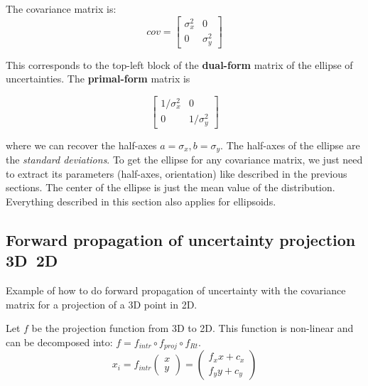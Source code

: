 The covariance matrix is:
\begin{equation}
    cov = \left[\begin{array}{cc}
        \sigma_x^2 & 0 \\
        0 & \sigma_y^2
    \end{array}\right]
\end{equation}

This corresponds to the top-left block of the \textbf{dual-form} matrix of the ellipse of uncertainties. The \textbf{primal-form} matrix is

\begin{equation}
    \left[\begin{array}{cc}
        1/\sigma_x^2 & 0 \\
        0 & 1/\sigma_y^2
    \end{array}\right]
\end{equation}

where we can recover the half-axes $a = \sigma_x, b = \sigma_y$.
The half-axes of the ellipse are the \textit{standard deviations}. To get the ellipse for any covariance matrix, we just need to extract its parameters (half-axes, orientation) like described in the previous sections. The center of the ellipse is just the mean value of the distribution. 
Everything described in this section also applies for ellipsoids.





\subsection{Forward propagation of uncertainty projection 3D~2D}
Example of how to do forward propagation of uncertainty with the covariance matrix for a projection of a 3D point in 2D.

Let $f$ be the projection function from 3D to 2D. This function is non-linear and can be decomposed into: $f = f_{intr} \circ f_{proj} \circ f_{Rt}$.
\begin{equation}
    x_i = f_{intr}\left(\begin{array}{c}
        x \\ y \end{array}\right) = 
        \left(\begin{array}{c}
            f_x x + c_x \\
            f_y y + c_y
        \end{array}\right)
\end{equation}

